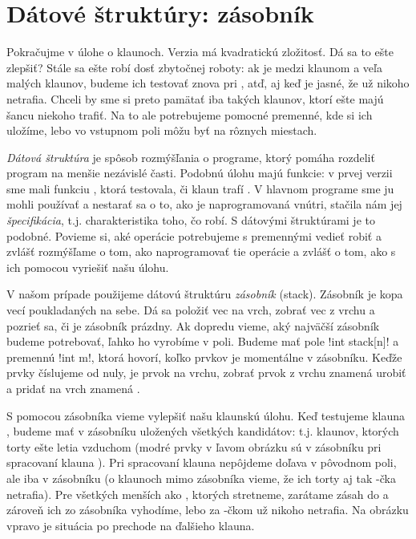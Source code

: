 \chapter{Dátové štruktúry: zásobník}
\label{sect:stack}
\def\stringcolor{solarized@blue}

Pokračujme v úlohe o klaunoch. Verzia  má kvadratickú zložitosť. 
Dá sa to ešte zlepšiť? Stále sa ešte robí dosť zbytočnej roboty: ak je medzi klaunom
 a  veľa malých klaunov, budeme ich testovať znova pri , 
atď, aj keď je jasné, že už nikoho netrafia. Chceli by sme si preto pamätať
iba takých klaunov, ktorí ešte majú šancu niekoho trafiť. Na to ale potrebujeme
pomocné premenné, kde si ich uložíme, lebo vo vstupnom poli môžu byť na rôznych miestach.

{\em Dátová štruktúra} je spôsob rozmýšľania o programe, ktorý pomáha rozdeliť program
na menšie nezávislé časti. Podobnú úlohu majú funkcie: v prvej verzii sme mali
funkciu , ktorá testovala, či klaun  trafí . V hlavnom
programe sme ju mohli používať a nestarať sa o to, ako je naprogramovaná vnútri, stačila
nám jej {\em špecifikácia}, t.j. charakteristika toho, čo robí. S dátovými 
štruktúrami je to podobné.
Povieme si, aké operácie potrebujeme s premennými vedieť robiť a zvlášť rozmýšľame o tom,
ako naprogramovať tie operácie a zvlášť o tom, ako s ich pomocou vyriešiť našu úlohu. 

 V našom prípade
použijeme dátovú štruktúru {\em zásobník} (stack). 
Zásobník je kopa vecí poukladaných na sebe. Dá
sa položiť vec na vrch, zobrať vec z vrchu a pozrieť sa, či je zásobník prázdny.
Ak dopredu vieme, aký najväčší zásobník budeme potrebovať, ľahko ho vyrobíme v poli.
Budeme mať pole \prg!int stack[n]! a premennú \prg!int m!, ktorá hovorí, koľko prvkov
je momentálne v zásobníku. Keďže prvky číslujeme od nuly,  je 
prvok na vrchu, zobrať prvok z vrchu znamená urobiť  a pridať  na vrch
znamená
. 


S pomocou zásobníka vieme vylepšiť našu klaunskú úlohu. Keď testujeme klauna ,
budeme mať v zásobníku uložených všetkých kandidátov: t.j. klaunov, ktorých torty 
ešte letia vzduchom (modré prvky v ľavom obrázku sú v zásobníku pri spracovaní
klauna ). Pri spracovaní klauna  nepôjdeme doľava v pôvodnom poli,
ale iba v zásobníku (o klaunoch mimo zásobníka vieme, že ich torty aj tak
-čka netrafia). Pre všetkých menších ako , ktorých stretneme, 
zarátame zásah do  a zároveň ich zo zásobníka vyhodíme, lebo za -čkom
už nikoho netrafia. Na obrázku vpravo je situácia po prechode na ďalšieho klauna.


